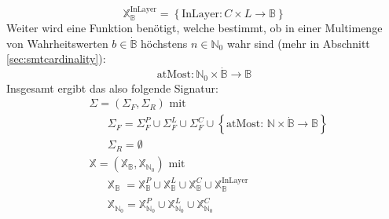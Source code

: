 \[
    \mathbb{X}_{\mathbb{B}}^{\text{InLayer}} = \left\{ \text{InLayer}: C \times L \rightarrow \mathbb{B} \right\}
\]
Weiter wird eine Funktion benötigt, welche bestimmt, ob in einer Multimenge von Wahrheitswerten $b \in \dot{\mathbb{B}}$ höchstens $n \in \mathbb{N}_0$ wahr sind (mehr in Abschnitt \ref{sec:smtcardinality}):
\[
    \text{atMost}: \mathbb{N}_0 \times \dot{\mathbb{B}} \rightarrow \mathbb{B}
\]
Insgesamt ergibt das also folgende Signatur:
\begin{align*}
    &\hspace{0pt} \Sigma = \left( \Sigma_F, \Sigma_R \right) \text{ mit } \\
    &\hspace{20pt} \Sigma_F = \Sigma_{F}^{P} \cup \Sigma_{F}^{L} \cup \Sigma_{F}^{C} \cup \left\{ \text{atMost: } \mathbb{N} \times \dot{\mathbb{B}} \rightarrow \mathbb{B} \right\}\\
    &\hspace{20pt} \Sigma_R = \emptyset \\
    &\hspace{0pt} \mathbb{X} = (\mathbb{X}_{\mathbb{B}}, \mathbb{X}_{\mathbb{N}_0}) \text{ mit} \\
    &\hspace{20pt} \mathbb{X}_{\mathbb{B}_{\phantom{0}}} = \mathbb{X}^{P}_{\mathbb{B}} \cup \mathbb{X}^{L}_{\mathbb{B}} \cup \mathbb{X}^{C}_{\mathbb{B}} \cup \mathbb{X}^{\text{InLayer}}_{\mathbb{B}} \\
    &\hspace{20pt} \mathbb{X}_{\mathbb{N}_0} = \mathbb{X}^{P}_{\mathbb{N}_0} \cup \mathbb{X}^{L}_{\mathbb{N}_0} \cup \mathbb{X}^{C}_{\mathbb{N}_0}
\end{align*}

